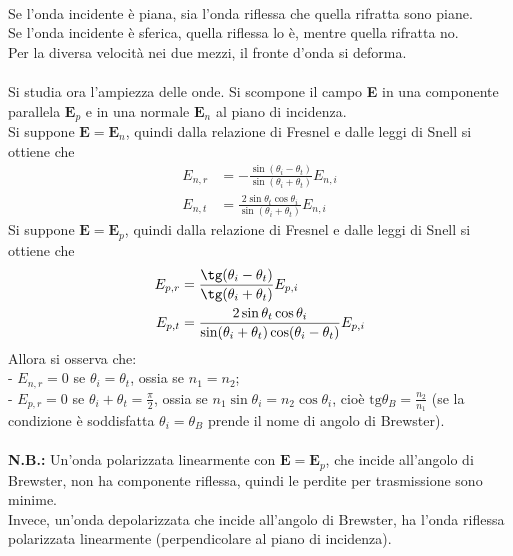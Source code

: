 \documentclass{article}
\begin{document}
\\
Se l’onda incidente è piana, sia l’onda riflessa che quella
rifratta sono piane.\\
Se l’onda incidente è sferica, quella riflessa lo è, mentre quella rifratta no.\\
Per la diversa velocità nei due mezzi, il fronte d’onda si deforma.\\
\\
Si studia ora l'ampiezza delle onde. Si scompone il campo \textbf{E} in una componente parallela $\textbf{E}_p$ e in una normale $\textbf{E}_n$ al piano di incidenza.\\
Si suppone $\textbf{E}=\textbf{E}_n$, quindi dalla relazione di Fresnel e dalle leggi di Snell si ottiene che 
\begin{equation}
\begin{split}
    E_{n,r}&=-\frac{\sin(\theta_i-\theta_t)}{\sin(\theta_i+\theta_t)}E_{n,i} \\
    E_{n,t}&=\frac{2\sin\theta_t\cos\theta_i}{\sin(\theta_i+\theta_t)}E_{n,i}
    \nonumber
\end{split}
\end{equation}
Si suppone $\textbf{E}=\textbf{E}_p$, quindi dalla relazione di Fresnel e dalle leggi di Snell si ottiene che 
\begin{equation}
\begin{split}
    E_{p,r}&=\frac{\tg(\theta_i-\theta_t)}{\tg(\theta_i+\theta_t)}E_{p,i} \\
    E_{p,t}&=\frac{2\sin\theta_t\cos\theta_i}{\sin(\theta_i+\theta_t)\cos(\theta_i-\theta_t)}E_{p,i}
    \nonumber
\end{split}
\end{equation}
Allora si osserva che:\\
- $E_{n,r}=0$ se $\theta_i=\theta_t$, ossia se $n_1=n_2$;\\
- $E_{p,r}=0$ se $\theta_i+\theta_t=\frac{\pi}{2}$, ossia se $n_1 \sin\theta_i = n_2\cos \theta_i$, cioè $\text{tg} \theta_B =\frac{n_2}{n_1}$ (se la condizione è soddisfatta $\theta_i = \theta_B$ prende il nome di angolo di Brewster).\\
\\
\textbf{N.B.:} Un’onda polarizzata linearmente con $\textbf{E}=\textbf{E}_p$, che incide all’angolo di Brewster, non ha componente riflessa, quindi le perdite per trasmissione sono minime.\\
Invece, un’onda depolarizzata che incide all’angolo di Brewster, ha l’onda riflessa polarizzata linearmente (perpendicolare al piano di incidenza).\\
\end{document}
